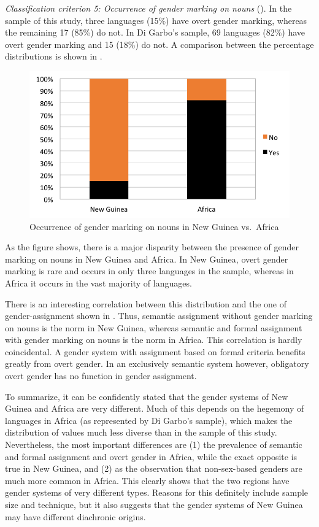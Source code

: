 \documentclass[output=collectionpaper]{langsci/langscibook}
\begin{document}
\textit{Classification criterion 5: Occurrence of gender marking on nouns} ().
In the sample of this study, three languages (15\%) have overt gender marking, whereas the remaining 17 (85\%) do not. In Di Garbo's sample, 69 languages (82\%) have overt gender marking and 15 (18\%) do not. A comparison between the percentage distributions is shown in .


\begin{figure}
\includegraphics[width=.8\textwidth]{figures/09/fig11.png}
\caption{Occurrence of gender marking on nouns in New Guinea vs.\ Africa}
\label{fig:Svard:11}

\end{figure}

As the figure shows, there is a major disparity between the presence of gender marking on nouns in New Guinea and Africa. In New Guinea, overt gender marking is rare and occurs in only three languages in the sample, whereas in Africa it occurs in the vast majority of languages.

There is an interesting correlation between this distribution and the one of gender-assignment shown in . Thus, semantic assignment without gender marking on nouns is the norm in New Guinea, whereas semantic and formal assignment with gender marking on nouns is the norm in Africa. This correlation is hardly coincidental. A gender system with assignment based on formal criteria benefits greatly from overt gender. In an exclusively semantic system however, obligatory overt gender has no function in gender assignment.

To summarize, it can be confidently stated that the gender systems of New Guinea and Africa are very different. Much of this depends on the hegemony of  languages in Africa (as represented by Di Garbo's sample), which makes the distribution of values much less diverse than in the sample of this study. Nevertheless, the most important differences are (1) the prevalence of semantic and formal assignment and overt gender in Africa, while the exact opposite is true in New Guinea, and (2) as the observation that non-sex-based genders are much more common in Africa. This clearly shows that the two regions have gender systems of very different types. Reasons for this definitely include sample size and technique, but it also suggests that the gender systems of New Guinea may have different diachronic origins.
\end{document}
